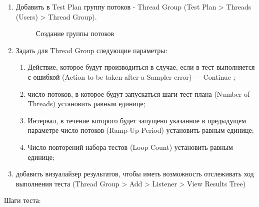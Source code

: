\begin{enumerate}
\item Добавить в Test Plan группу потоков - Thread Group (Test Plan > Threads (Users) > Thread Group).

\begin{figure}[ht]
\caption{Создание группы потоков}
\label{ris:testplan.png}
\end{figure}

\item Задать для Thread Group следующие параметры:

\begin{enumerate}
\item Действие, которое будут производиться в случае, если в тест выполняется с ошибкой
(Action to be taken after a Sampler error) --- Continue ;
\item число потоков, в которое будут запускаться шаги тест-плана (Number of Threads) установить равным единице;
\item Интервал, в течение которого будет запущено указанное в предыдущем параметре
число потоков (Ramp-Up Period) установить равным единице;
\item Число повторений набора тестов (Loop Count) установить равным единице;
\end{enumerate}

\item добавить визуалайзер результатов, чтобы иметь возможность отслеживать ход выполнения теста (Thread Group >
Add > Listener > View Results Tree)
\end{enumerate}

Шаги теста:


